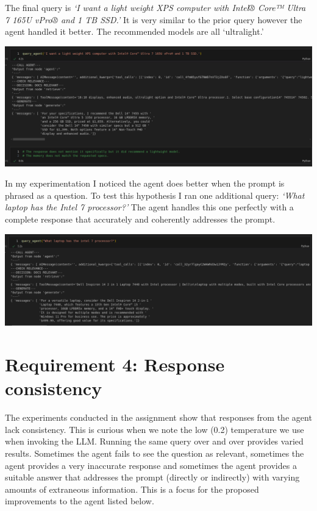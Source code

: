 \documentclass[11pt,letterpaper]{article}
\begin{document}
The final query is \textit{`I want a light weight XPS computer with Intel® Core™ Ultra 7 165U vPro® and 1 TB SSD.'} It is very similar to the prior query however the agent handled it better. The recommended models are all `ultralight.'

\begin{center}
    \includegraphics[width=1.0\linewidth]{q4.png}
\end{center}

In my experimentation I noticed the agent does better when the prompt is phrased as a question. To test this hypothesis I ran one additional query: \textit{`What laptop has the Intel 7 processor?'} The agent handles this one perfectly with a complete response that accurately and coherently addresses the prompt.

\begin{center}
    \includegraphics[width=1.0\linewidth]{q5.png}
\end{center}


\section*{Requirement 4: Response consistency}
\tab The experiments conducted in the assignment show that responses from the agent lack consistency. This is curious when we note the low (0.2) temperature we use when invoking the LLM. Running the same query over and over provides varied results. Sometimes the agent fails to see the question as relevant, sometimes the agent provides a very inaccurate response and sometimes the agent provides a suitable answer that addresses the prompt (directly or indirectly) with varying amounts of extraneous information. This is a focus for the proposed improvements to the agent listed below.
\end{document}
